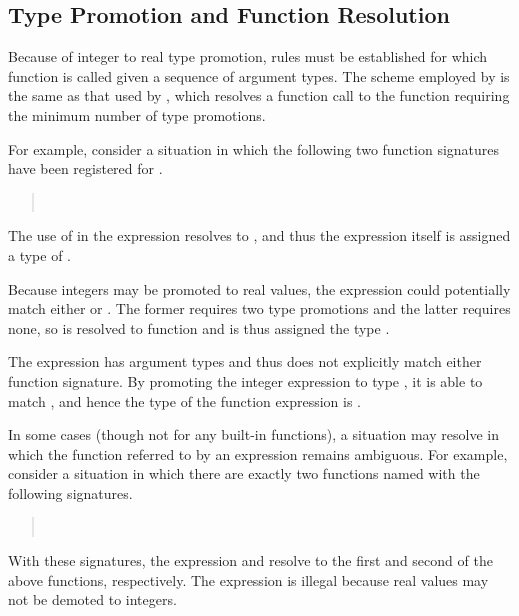 \subsection{Type Promotion and Function Resolution}

Because of integer to real type promotion, rules must be established
for which function is called given a sequence of argument types.  The
scheme employed by \Stan is the same as that used by \Cpp, which
resolves a function call to the function requiring the minimum number
of type promotions.  

For example, consider a situation in which the following two function
signatures have been registered for .
%
\begin{quote}
\\
\end{quote}
%
The use of  in the expression  resolves
to , and thus the expression 
itself is assigned a type of .  

Because integers may be promoted to real values, the expression
 could potentially match either 
or .  The former requires two type promotions and
the latter requires none, so  is resolved to function
 and is thus assigned the type .

The expression  has argument types 
and thus does not explicitly match either function signature.  By
promoting the integer expression  to type , it is
able to match , and hence the type of the
function expression  is .

In some cases (though not for any built-in \Stan functions), a
situation may resolve in which the function referred to by an
expression remains ambiguous.  For example, consider a situation in
which there are exactly two functions named  with the
following signatures.
%
\begin{quote}
\\
\end{quote}
%
With these signatures, the expression  and
 resolve to the first and second of the above
functions, respectively.  The expression  is
illegal because real values may not be demoted to integers.  

